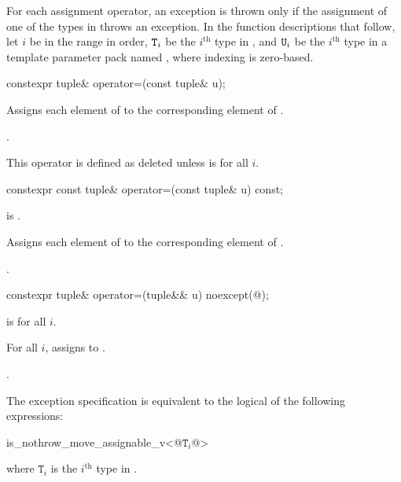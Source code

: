 \documentclass{wg21}
\begin{document}
\pnum
For each  assignment operator, an exception is thrown only if the
assignment of one of the types in  throws an exception.
In the function descriptions that follow, let $i$ be in the range 
in order, $\texttt{T}_i$ be the $i^\text{th}$ type in ,
and $\texttt{U}_i$ be the $i^\text{th}$ type in a
template parameter pack named , where indexing is zero-based.

%
\begin{itemdecl}
    constexpr tuple& operator=(const tuple& u);
\end{itemdecl}

\begin{itemdescr}
    \pnum
    \effects
    Assigns each element of  to the corresponding
    element of .

    \pnum
    \returns
    .

    \pnum
    \remarks
    This operator is defined as deleted unless
     is  for all $i$.
\end{itemdescr}

%
\begin{itemdecl}
    constexpr const tuple& operator=(const tuple& u) const;
\end{itemdecl}

\begin{itemdescr}
    \pnum
    \constraints
     is .

    \pnum
    \effects
    Assigns each element of  to the corresponding element of .

    \pnum
    \returns
    .
\end{itemdescr}

%
\begin{itemdecl}
    constexpr tuple& operator=(tuple&& u) noexcept(@\seebelow@);
\end{itemdecl}

\begin{itemdescr}
    \pnum
    \constraints
     is  for all $i$.

    \pnum
    \effects
    For all $i$, assigns  to
    .

    \pnum
    \returns
    .

    \pnum
    \remarks
    The exception specification is equivalent to the logical  of the
    following expressions:

    \begin{codeblock}
        is_nothrow_move_assignable_v<@$\mathtt{T}_i$@>
    \end{codeblock}
    where $\mathtt{T}_i$ is the $i^\text{th}$ type in .
\end{itemdescr}
\end{document}
